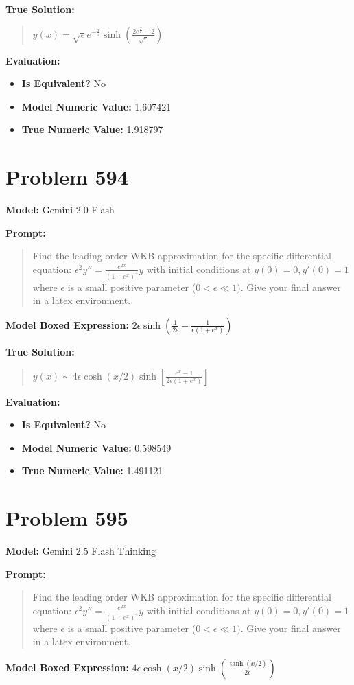 \documentclass{article}
\begin{document}
\textbf{True Solution:}
\begin{quote}
$y(x) = \sqrt{\epsilon} e^{-\frac{x}{4}}\sinh(\frac{2e^{\frac{x}{2}}-2}{\sqrt{\epsilon}})$
\end{quote}

\textbf{Evaluation:}
\begin{itemize}
\item \textbf{Is Equivalent?} No
\item \textbf{Model Numeric Value:} 1.607421
\item \textbf{True Numeric Value:} 1.918797
\end{itemize}
\vspace{1cm}
\section*{Problem 594}
\textbf{Model:} Gemini 2.0 Flash

\textbf{Prompt:}
\begin{quote}
Find the leading order WKB approximation for the specific differential equation: $\epsilon^2 y'' = \frac{e^{2x}}{(1+e^x)^4} y$ with initial conditions at $y(0)=0, y'(0)=1$ where $\epsilon$ is a small positive parameter ($0 < \epsilon \ll 1)$. Give your final answer in a \boxed latex environment.
\end{quote}
\textbf{Model Boxed Expression:} $2\epsilon \sinh\left(\frac{1}{2\epsilon} - \frac{1}{\epsilon(1+e^x)}\right)$

\textbf{True Solution:}
\begin{quote}
$y(x) \sim 4\epsilon \cosh(x/2)\sinh\left[\frac{e^x-1}{2\epsilon(1+e^x)}\right]$
\end{quote}

\textbf{Evaluation:}
\begin{itemize}
\item \textbf{Is Equivalent?} No
\item \textbf{Model Numeric Value:} 0.598549
\item \textbf{True Numeric Value:} 1.491121
\end{itemize}
\vspace{1cm}
\section*{Problem 595}
\textbf{Model:} Gemini 2.5 Flash Thinking

\textbf{Prompt:}
\begin{quote}
Find the leading order WKB approximation for the specific differential equation: $\epsilon^2 y'' = \frac{e^{2x}}{(1+e^x)^4} y$ with initial conditions at $y(0)=0, y'(0)=1$ where $\epsilon$ is a small positive parameter ($0 < \epsilon \ll 1)$. Give your final answer in a \boxed latex environment.
\end{quote}
\textbf{Model Boxed Expression:} $4\epsilon \cosh(x/2) \sinh\left(\frac{\tanh(x/2)}{2\epsilon}\right)$
\end{document}
